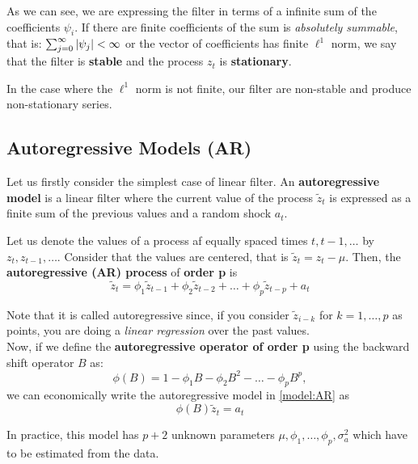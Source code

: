 As we can see, we are expressing the filter in terms of a infinite sum of the coefficients \(\psi_{i}\). If there are finite coefficients of the sum is \emph{absolutely summable}, that is: \(\sum_{j = 0}^{\infty}\left\lvert \psi_{j} \right\rvert < \infty\) or the vector of coefficients has finite \(\ell^{1}\) norm, we say that the filter is \textbf{stable} and the process \(z_{t}\) is \textbf{stationary}.

In the case where the \(\ell^{1}\) norm is not finite, our filter are non-stable and produce non-stationary series.

\subsection{Autoregressive Models (AR)}

Let us firstly consider the simplest case of linear filter. An \textbf{autoregressive model} is a linear filter where the current value of the process \(\tilde z_{t}\) is expressed as a finite sum of the previous values and a random shock \(a_{t}\).

\begin{ndef}
  Let us denote the values of a process af equally spaced times \(t,t-1,\dots\) by \(z_{t}, z_{t-1}, \dots\). Consider that the values are centered, that is \(\tilde z_{t} = z_{t} - \mu\). Then, the \textbf{autoregressive (AR) process} of \textbf{order p} is
  \begin{equation}\label{model:AR}
    \tilde z_{t} = \phi_{1}\tilde z_{t-1} + \phi_{2}\tilde z_{t-2}+ \dots  + \phi_{p}\tilde z_{t-p} + a_{t}
    \end{equation}
\end{ndef}

Note that it is called autoregressive since, if you consider \(\tilde z_{i-k}\) for \(k = 1,\dots,p\) as points, you are doing a \emph{linear regression} over the past values.\\

Now, if we define the \textbf{autoregressive operator of order p} using the backward shift operator \(B\) as:
\[
\phi(B) = 1- \phi_{1}B - \phi_{2}B^{2} - \dots - \phi_{p}B^{p},
\]
we can economically write the autoregressive model in \eqref{model:AR} as
\begin{equation}\label{model:ar:red}
  \phi(B)\tilde z_{t} = a_{t}
\end{equation}

In practice, this model has \(p+2\) unknown parameters \(\mu,\phi_{1},\dots,\phi_{p},\sigma_{a}^{2}\) which have to be estimated from the data.

